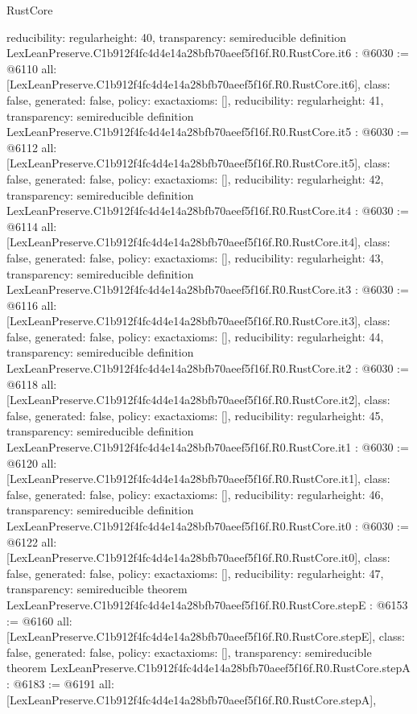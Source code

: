 \begin{lexlean}{RustCore}
\begin{coremodule}
{  reducibility: regular{height: 40},
  transparency: semireducible
}
definition LexLeanPreserve.C1b912f4fc4d4e14a28bfb70aeef5f16f.R0.RustCore.it6 : @6030 := @6110 {
  all: [LexLeanPreserve.C1b912f4fc4d4e14a28bfb70aeef5f16f.R0.RustCore.it6],
  class: false,
  generated: false,
  policy: exact{axioms: []},
  reducibility: regular{height: 41},
  transparency: semireducible
}
definition LexLeanPreserve.C1b912f4fc4d4e14a28bfb70aeef5f16f.R0.RustCore.it5 : @6030 := @6112 {
  all: [LexLeanPreserve.C1b912f4fc4d4e14a28bfb70aeef5f16f.R0.RustCore.it5],
  class: false,
  generated: false,
  policy: exact{axioms: []},
  reducibility: regular{height: 42},
  transparency: semireducible
}
definition LexLeanPreserve.C1b912f4fc4d4e14a28bfb70aeef5f16f.R0.RustCore.it4 : @6030 := @6114 {
  all: [LexLeanPreserve.C1b912f4fc4d4e14a28bfb70aeef5f16f.R0.RustCore.it4],
  class: false,
  generated: false,
  policy: exact{axioms: []},
  reducibility: regular{height: 43},
  transparency: semireducible
}
definition LexLeanPreserve.C1b912f4fc4d4e14a28bfb70aeef5f16f.R0.RustCore.it3 : @6030 := @6116 {
  all: [LexLeanPreserve.C1b912f4fc4d4e14a28bfb70aeef5f16f.R0.RustCore.it3],
  class: false,
  generated: false,
  policy: exact{axioms: []},
  reducibility: regular{height: 44},
  transparency: semireducible
}
definition LexLeanPreserve.C1b912f4fc4d4e14a28bfb70aeef5f16f.R0.RustCore.it2 : @6030 := @6118 {
  all: [LexLeanPreserve.C1b912f4fc4d4e14a28bfb70aeef5f16f.R0.RustCore.it2],
  class: false,
  generated: false,
  policy: exact{axioms: []},
  reducibility: regular{height: 45},
  transparency: semireducible
}
definition LexLeanPreserve.C1b912f4fc4d4e14a28bfb70aeef5f16f.R0.RustCore.it1 : @6030 := @6120 {
  all: [LexLeanPreserve.C1b912f4fc4d4e14a28bfb70aeef5f16f.R0.RustCore.it1],
  class: false,
  generated: false,
  policy: exact{axioms: []},
  reducibility: regular{height: 46},
  transparency: semireducible
}
definition LexLeanPreserve.C1b912f4fc4d4e14a28bfb70aeef5f16f.R0.RustCore.it0 : @6030 := @6122 {
  all: [LexLeanPreserve.C1b912f4fc4d4e14a28bfb70aeef5f16f.R0.RustCore.it0],
  class: false,
  generated: false,
  policy: exact{axioms: []},
  reducibility: regular{height: 47},
  transparency: semireducible
}
theorem LexLeanPreserve.C1b912f4fc4d4e14a28bfb70aeef5f16f.R0.RustCore.stepE : @6153 := @6160 {
  all: [LexLeanPreserve.C1b912f4fc4d4e14a28bfb70aeef5f16f.R0.RustCore.stepE],
  class: false,
  generated: false,
  policy: exact{axioms: []},
  transparency: semireducible
}
theorem LexLeanPreserve.C1b912f4fc4d4e14a28bfb70aeef5f16f.R0.RustCore.stepA : @6183 := @6191 {
  all: [LexLeanPreserve.C1b912f4fc4d4e14a28bfb70aeef5f16f.R0.RustCore.stepA],
}
\end{coremodule}
\end{lexlean}
